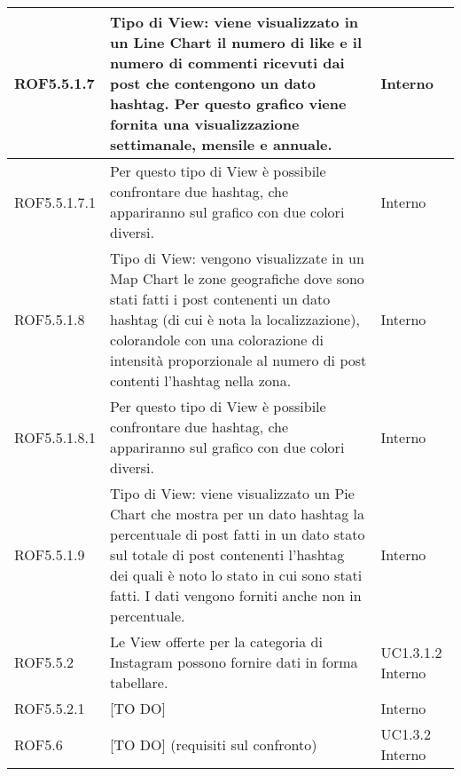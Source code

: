 \begin{center}
\begin{longtable}{| p{2.5cm} | p{8cm} | p{2cm} |}
		ROF5.5.1.7  &  Tipo di View: viene visualizzato in un Line Chart il numero di like e il numero di commenti ricevuti dai post che contengono un dato hashtag. Per questo grafico viene fornita una visualizzazione settimanale, mensile e annuale. & Interno \\
		\hline
		ROF5.5.1.7.1  &  Per questo tipo di View è possibile confrontare due hashtag, che appariranno sul grafico con due colori diversi. & Interno \\
		\hline
		ROF5.5.1.8  &  Tipo di View: vengono visualizzate in un Map Chart le zone geografiche dove sono stati fatti i post contenenti un dato hashtag (di cui è nota la localizzazione), colorandole con una colorazione di intensità proporzionale al numero di post contenti l'hashtag nella zona. & Interno \\
		\hline
		ROF5.5.1.8.1  &  Per questo tipo di View è possibile confrontare due hashtag, che appariranno sul grafico con due colori diversi. & Interno \\
		\hline
		ROF5.5.1.9  &  Tipo di View: viene visualizzato un Pie Chart che mostra per un dato hashtag la percentuale di post fatti in un dato stato sul totale di post contenenti l'hashtag dei quali è noto lo stato in cui sono stati fatti. I dati vengono forniti anche non in percentuale. & Interno \\
		\hline

		ROF5.5.2  & Le View offerte per la categoria di Instagram possono fornire dati in forma tabellare.  &  UC1.3.1.2 \newline Interno \\
		\hline
		ROF5.5.2.1  &  [TO DO] & Interno \\
		\hline

		ROF5.6  &  [TO DO] (requisiti sul confronto) &  UC1.3.2 \newline Interno \\
		\hline







\end{longtable}
\end{center}
